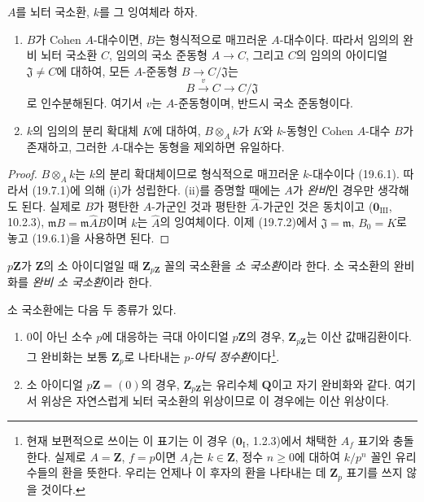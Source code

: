 \begin{theorem}[19.8.2]
\label{0.19.8.2-ko}
$A$를 뇌터 국소환, $k$를 그 잉여체라 하자.
\begin{enumerate}
  \item[(i)] $B$가 Cohen $A$-대수이면, $B$는 형식적으로 매끄러운
  $A$-대수이다. 따라서 임의의 완비 뇌터 국소환 $C$, 임의의 국소
  준동형 $A\to C$, 그리고 $C$의 임의의 아이디얼
  $\mathfrak J\neq C$에 대하여, 모든 $A$-준동형
  $B\to C/\mathfrak J$는
  \[
    B\xrightarrow{v}C\longrightarrow C/\mathfrak J
  \]
  로 인수분해된다. 여기서 $v$는 $A$-준동형이며, 반드시 국소
  준동형이다.
  \item[(ii)] $k$의 임의의 분리 확대체 $K$에 대하여,
  $B\otimes_A k$가 $K$와 $k$-동형인 Cohen $A$-대수 $B$가
  존재하고, 그러한 $A$-대수는 동형을 제외하면 유일하다.
\end{enumerate}
\end{theorem}

\begin{proof}
$B\otimes_A k$는 $k$의 분리 확대체이므로 형식적으로 매끄러운
$k$-대수이다 (19.6.1). 따라서 (19.7.1)에 의해 (i)가 성립한다.
(ii)를 증명할 때에는 $A$가 \emph{완비}인 경우만 생각해도 된다.
실제로 $B$가 평탄한 $A$-가군인 것과 평탄한 $\widehat A$-가군인
것은 동치이고 ($\mathbf 0_{\mathrm{III}}$, 10.2.3),
$\mathfrak mB=\mathfrak m\widehat AB$이며 $k$는 $\widehat A$의
잉여체이다. 이제 (19.7.2)에서 $\mathfrak J=\mathfrak m$,
$B_0=K$로 놓고 (19.6.1)을 사용하면 된다.
\end{proof}

\begin{definition}[19.8.3]
\label{0.19.8.3-ko}
$p\mathbf Z$가 $\mathbf Z$의 소 아이디얼일 때
$\mathbf Z_{p\mathbf Z}$ 꼴의 국소환을 \emph{소 국소환}이라 한다.
소 국소환의 완비화를 \emph{완비 소 국소환}이라 한다.
\end{definition}

소 국소환에는 다음 두 종류가 있다.
\begin{enumerate}
  \item[$1^{\mathrm o}$] $0$이 아닌 소수 $p$에 대응하는 극대
  아이디얼 $p\mathbf Z$의 경우, $\mathbf Z_{p\mathbf Z}$는 이산 값매김환이다.
  그 완비화는 보통 $\mathbf Z_p$로 나타내는
  \emph{$p$-아딕 정수환}이다\footnote{현재 보편적으로 쓰이는 이
  표기는 이 경우 ($\mathbf 0_{\mathrm I}$, 1.2.3)에서 채택한
  $A_f$ 표기와 충돌한다. 실제로 $A=\mathbf Z$, $f=p$이면
  $A_f$는 $k\in\mathbf Z$, 정수 $n\geq0$에 대하여 $k/p^n$ 꼴인
  유리수들의 환을 뜻한다. 우리는 언제나 이 후자의 환을 나타내는
  데 $\mathbf Z_p$ 표기를 쓰지 않을 것이다.}.
  \item[$2^{\mathrm o}$] 소 아이디얼 $p\mathbf Z=(0)$의 경우,
  $\mathbf Z_{p\mathbf Z}$는 유리수체 $\mathbf Q$이고 자기 완비화와
  같다. 여기서 위상은 자연스럽게 뇌터 국소환의 위상이므로 이
  경우에는 이산 위상이다.
\end{enumerate}

